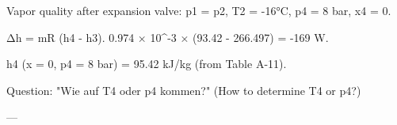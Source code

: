 Vapor quality after expansion valve:  
p1 = p2, T2 = -16°C, p4 = 8 bar, x4 = 0.  

Δh = mR (h4 - h3).  
0.974 × 10^-3 × (93.42 - 266.497) = -169 W.  

h4 (x = 0, p4 = 8 bar) = 95.42 kJ/kg (from Table A-11).  

Question: "Wie auf T4 oder p4 kommen?" (How to determine T4 or p4?)  

---